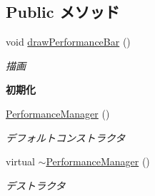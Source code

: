 \subsection*{Public メソッド}
\begin{DoxyCompactItemize}
\item 
void \hyperlink{class_performance_manager_a62fc531484cf223da9d5924897f1a0f0}{draw\-Performance\-Bar} ()
\begin{DoxyCompactList}\small\item\em 描画 \end{DoxyCompactList}\end{DoxyCompactItemize}
\begin{Indent}{\bf 初期化}\par
\begin{DoxyCompactItemize}
\item 
\hyperlink{class_performance_manager_ab9e6bcde7a6a29b4b791300805e3774d}{Performance\-Manager} ()
\begin{DoxyCompactList}\small\item\em デフォルトコンストラクタ \end{DoxyCompactList}\item 
virtual \hyperlink{class_performance_manager_a927ff2c765b7f5af30f1b8b465a5a946}{$\sim$\-Performance\-Manager} ()
\begin{DoxyCompactList}\small\item\em デストラクタ \end{DoxyCompactList}\end{DoxyCompactItemize}
\end{Indent}
